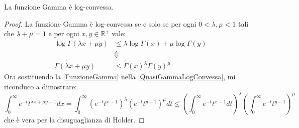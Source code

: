  \begin{lemma}\label{GammaLogConvessa}
  La funzione Gamma è log-convessa.
 \end{lemma}
 \begin{proof}
  La funzione Gamma è log-convessa se e solo se per ogni $0<\lambda,\mu < 1$ tali che $\lambda+\mu=1$
  e per ogni $x,y \in \mathbb{R}^+$ vale:
  \begin{equation}\label{QuasiGammaLogConvessa}
  \begin{split} 
		\log \Gamma(\lambda x+\mu y )  & \le \lambda \log \Gamma(x) + \mu\log \Gamma( y )\\
		& \Updownarrow  \\
		\Gamma(\lambda x+\mu y ) & \le  \Gamma(x)^{\lambda}\Gamma( y )^{\mu}
	\end{split}\end{equation}
 Ora sostituendo la \cref{FunzioneGamma} nella \cref{QuasiGammaLogConvessa}, mi riconduco a dimostrare:
 \begin{equation*}
  \int_0^{\infty}{e^{-t}t^{\lambda x+\mu y-1}dx}=\int_0^{\infty}{(e^{-t}t^{x-1})^\lambda (e^{-t}t^{y-1})^{\mu}dt} \le 
       \left(\int_0^{\infty}{e^{-t}t^{x-1}dt}\right)^\lambda \left(\int_0^{\infty}{e^{-t}t^{y-1}}\right)^{\mu}
 \end{equation*}
 che è vera per la disuguaglianza di Holder.
 \end{proof}
 
